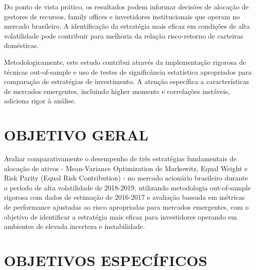 Do ponto de vista prático, os resultados podem informar decisões de alocação de gestores de recursos, family offices e investidores institucionais que operam no mercado brasileiro. A identificação da estratégia mais eficaz em condições de alta volatilidade pode contribuir para melhoria da relação risco-retorno de carteiras domésticas.

Metodologicamente, este estudo contribui através da implementação rigorosa de técnicas out-of-sample e uso de testes de significância estatística apropriados para comparação de estratégias de investimento. A atenção específica a características de mercados emergentes, incluindo higher moments e correlações instáveis, adiciona rigor à análise.

\section{OBJETIVO GERAL}

Avaliar comparativamente o desempenho de três estratégias fundamentais de alocação de ativos - Mean-Variance Optimization de Markowitz, Equal Weight e Risk Parity (Equal Risk Contribution) - no mercado acionário brasileiro durante o período de alta volatilidade de 2018-2019, utilizando metodologia out-of-sample rigorosa com dados de estimação de 2016-2017 e avaliação baseada em métricas de performance ajustadas ao risco apropriadas para mercados emergentes, com o objetivo de identificar a estratégia mais eficaz para investidores operando em ambientes de elevada incerteza e instabilidade.

\section{OBJETIVOS ESPECÍFICOS}

